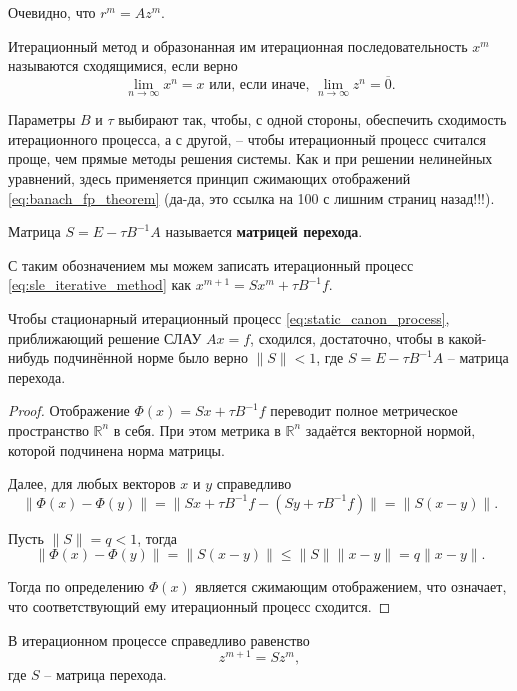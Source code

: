 \documentclass{article}
\begin{document}
Очевидно, что $r^m=Az^m$.

\newpage

\begin{define}
	Итерационный метод и образонанная им итерационная последовательность
	$x^m$ называются сходящимися, если верно
	\[\lim_{n\to\infty}x^n=x\text{ или, если иначе, }
	\lim_{n\to\infty}z^n=\overline{0}.\]
\end{define}

Параметры $B$ и $\tau$ выбирают так, чтобы, с одной стороны, обеспечить
сходимость итерационного процесса, а с другой, -- чтобы итерационный процесс
считался проще, чем прямые методы решения системы. Как и при решении нелинейных
уравнений, здесь применяется принцип сжимающих отображений
\eqref{eq:banach_fp_theorem} (да-да, это ссылка на 100 с лишним страниц
назад!!!).

\begin{define}
	Матрица $S=E-\tau B^{-1}A$ называется \textbf{матрицей перехода}.
\end{define}

С таким обозначением мы можем записать итерационный процесс
\eqref{eq:sle_iterative_method} как $x^{m+1}=Sx^m+\tau B^{-1}f$.

\begin{theorem}
\label{eq:sle_matrix_norm_cond}
	Чтобы стационарный итерационный процесс
	\eqref{eq:static_canon_process}, приближающий решение СЛАУ $Ax=f$,
	сходился, достаточно, чтобы в какой-нибудь подчинённой норме было верно
	$\|S\|<1$, где $S=E-\tau B^{-1}A$ -- матрица перехода.
\end{theorem}

\begin{proof}
	Отображение $\Phi(x)=Sx+\tau B^{-1}f$ переводит полное метрическое
	пространство $\mathbb R^n$ в себя. При этом метрика в $\mathbb R^n$
	задаётся векторной нормой, которой подчинена норма матрицы.

	Далее, для любых векторов $x$ и $y$ справедливо
	\[\|\Phi(x)-\Phi(y)\|=\|Sx+\tau B^{-1}f-(Sy+\tau B^{-1}f)\|=
	\|S(x-y)\|.\]

	Пусть $\|S\|=q<1$, тогда
	\[\|\Phi(x)-\Phi(y)\|=\|S(x-y)\|\le\|S\|\|x-y\|=q\|x-y\|.\]

	Тогда по определению $\Phi(x)$ является сжимающим отображением, что
	означает, что соответствующий ему итерационный процесс сходится.
\end{proof}

\begin{lemma}
	В итерационном процессе справедливо равенство
	\[z^{m+1}=Sz^m,\]
	где $S$ -- матрица перехода.
\end{lemma}
\end{document}
